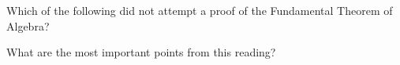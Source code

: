 \documentclass[nooutcomes]{ximera}
\begin{document}
\begin{question}
Which of the following did not attempt a proof of the Fundamental Theorem of Algebra?
\begin{multipleChoice}
\end{multipleChoice}
\end{question}


\begin{question}
What are the most important points from this reading?
\begin{freeResponse}
\end{freeResponse}

\end{question}
\end{document}
